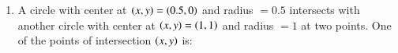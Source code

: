 \documentclass[journal,12pt,onecolumn]{IEEEtran}
\theoremstyle{remark}
\begin{document}
\begin{enumerate}
\begin{enumerate}
\end{enumerate}

\item A circle with center at $\left(x,y\right)=\left(0.5,0\right)$ and radius $=0.5$ intersects with another circle with center at $\left(x,y\right)=\left(1,1\right)$ and radius $=1$ at two points. One of the points of intersection $\left(x, y\right)$ is: \hfill{}
\begin{enumerate}
\end{enumerate}


\end{enumerate}
\end{document}
